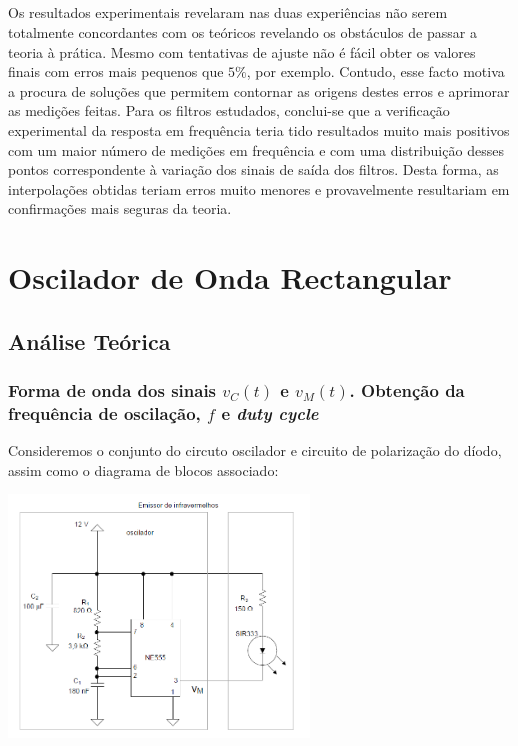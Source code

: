 \documentclass[a4paper,11pt]{report}
\begin{document}
\paragraph{}
Os resultados experimentais revelaram nas duas experiências não serem totalmente concordantes com os teóricos revelando os obstáculos de passar a teoria à prática. Mesmo com tentativas de ajuste não é fácil obter os valores finais com erros mais pequenos que $5\%$, por exemplo. Contudo, esse facto motiva a procura de soluções que permitem contornar as origens destes erros e aprimorar as medições feitas. Para os filtros estudados, conclui-se que a verificação experimental da resposta em frequência teria tido resultados muito mais positivos com um maior número de medições em frequência e com uma distribuição desses pontos correspondente à variação dos sinais de saída dos filtros. Desta forma, as interpolações obtidas teriam erros muito menores e provavelmente resultariam em confirmações mais seguras da teoria.


\chapter{Oscilador de Onda Rectangular}


\section{Análise Teórica}

\subsection{Forma de onda dos sinais $v_C(t)$ e $v_M(t)$. Obtenção da frequência de oscilação, $f$ e \textit{duty cycle}}
Consideremos o conjunto do circuto oscilador e circuito de polarização do díodo, assim como o diagrama de blocos associado:


\begin{center}
    \includegraphics[angle=0,width=0.6\textwidth]{O.png}
    \label{fig:O}
    
    \end{center}
    
\end{document}
